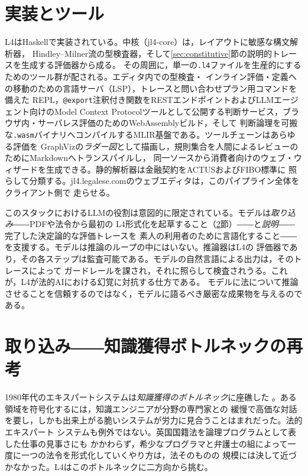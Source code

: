 \documentclass[11pt,a4paper]{ltjsarticle}
\newcommand{\code}[1]{\texttt{\small #1}}
\begin{document}
\section{実装とツール}\label{sec:impl}
L4はHaskellで実装されている。中核（\textsf{jl4-core}）は，レイアウトに敏感な構文解析器，
Hindley--Milner流の型検査器，そして\ref{sec:constitutive}節の説明的トレースを生成する評価器から成る。
その周囲に，単一の\code{.l4}ファイルを生産的にするためのツール群が配される。エディタ内での型検査・
インライン評価・定義への移動のための言語サーバ（LSP），トレースと問い合わせプラン用コマンドを備えた
REPL，\code{@export}注釈付き関数をRESTエンドポイントおよびLLMエージェント向けのModel Context
Protocolツールとして公開する判断サービス，ブラウザ内・サーバレス評価のためのWebAssemblyビルド，そして
判断論理を可搬な\code{.wasm}バイナリへコンパイルするMLIR基盤である。ツールチェーンはあらゆる評価を
GraphVizの\emph{ラダー図}として描画し，規則集合を人間によるレビューのためにMarkdownへトランスパイルし，
同一ソースから消費者向けのウェブ・ウィザードを生成できる。静的解析器は金融契約をACTUSおよびFIBO標準に
照らして分類する。\textsf{jl4.legalese.com}のウェブエディタは，このパイプライン全体をクライアント側で
走らせる。

このスタックにおけるLLMの役割は意図的に限定されている。モデルは\emph{取り込み}――PDFや法令から最初の
L4形式化を起草すること（\ref{sec:ingestion}節）――と\emph{説明}――完了した決定論的な評価トレースを
素人の利用者のために言語化すること――を支援する。モデルは推論のループの中にはいない。推論器はL4の
評価器であり，その各ステップは監査可能である。モデルの自然言語による出力は，そのトレースによって
ガードレールを課され，それに照らして検査されうる。これが，L4が法的AIにおける幻覚に対抗する仕方である。
モデルに法について推論させることを信頼するのではなく，モデルに語るべき厳密な成果物を与えるのである。

\section{取り込み――知識獲得ボトルネックの再考}\label{sec:ingestion}
1980年代のエキスパートシステムは\emph{知識獲得のボトルネック}に座礁した
\cite{feigenbaum1984,hayesroth1983}。ある領域を符号化するには，知識エンジニアが分野の専門家との
緩慢で高価な対話を要し，しかも出来上がる脆いシステムが労力に見合うことはまれだった。法的エキスパート
システムも例外ではない。英国国籍法を論理プログラムとして表した仕事の見事さ\cite{sergot1986bna}にも
かかわらず，希少なプログラマと弁護士の組によって一度に一つの法令を形式化していくやり方は，法そのものの
規模には決して近づかなかった。L4はこのボトルネックに二方向から挑む。
\end{document}
